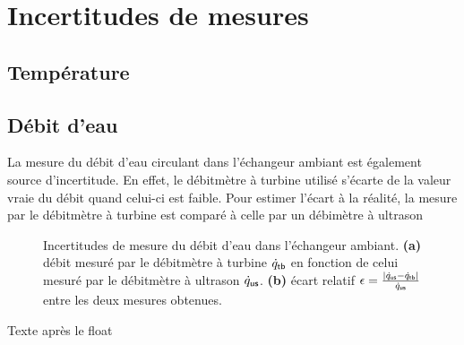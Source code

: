 \section{Incertitudes de mesures}


\subsection{Température}

\subsection{Débit d'eau}

La mesure du débit d'eau circulant dans l'échangeur ambiant est également source d'incertitude. En effet, le débitmètre à turbine utilisé  s'écarte de la valeur vraie du débit quand celui-ci est faible. Pour estimer l'écart à la réalité, la mesure par le débitmètre à turbine est comparé à celle par un débimètre à ultrason 

\begin{figure}[!ht]
    \centering
    
    \caption[Incertitudes de mesure du débit d'eau dans l'échangeur ambiant]{Incertitudes de mesure du débit d'eau dans l'échangeur ambiant. \linebreak \textbf{(a)} débit mesuré par le débitmètre à turbine $\dot q_{\sf tb}$ en fonction de celui mesuré par le débitmètre à ultrason $\dot q_{\sf us}$. \linebreak\textbf{(b)} écart relatif $\epsilon=\frac{|\dot q_{\sf us}-\dot q_{\sf tb}|}{\dot q_{\sf us}}$ entre les deux mesures obtenues.}
    \label{fig:IncertitudeDebitEau}
\end{figure}%

Texte après le float